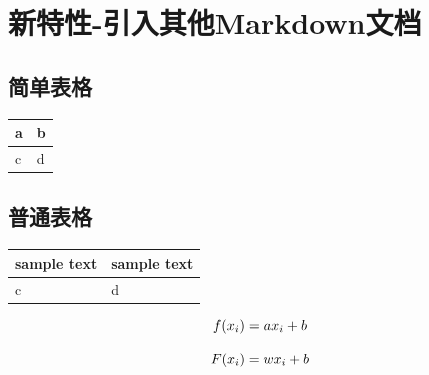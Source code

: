 \documentclass{article}
\newlength\tablewidth
\begin{document}
\section{新特性{-}引入其他Markdown文档}




\normalsize



\subsection{简单表格}


\begin{center}
\setlength\tablewidth{\dimexpr (\textwidth -4\tabcolsep)}
\begin{tabular}{|p{0.500\tablewidth}<{\centering}|p{0.500\tablewidth}<{\centering}|}
\hline
\rowcolor{tabletopgray}
\textbf{a}&\textbf{b}\\
\hline
c&d\\
\hline
\end{tabular}
\end{center}



\subsection{普通表格}


\begin{center}
\setlength\tablewidth{\dimexpr (\textwidth -4\tabcolsep)}
\begin{tabular}{|p{0.500\tablewidth}<{\centering}|p{0.500\tablewidth}<{\centering}|}
\hline
\rowcolor{tabletopgray}
\textbf{sample text }&\textbf{ sample text}\\
\hline
c&d\\
\hline
\end{tabular}
\end{center}


\normalsize



\[
f(x_i)=ax_i+b\\
\]



\begin{markquote}
\[
F(x_i) = wx_i+b\\
\]


\end{markquote}
\end{document}
